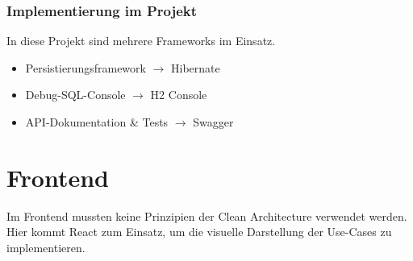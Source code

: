     	    \subsubsection{Implementierung im Projekt}
    	    In diese Projekt sind mehrere Frameworks im Einsatz. \\
    	    \begin{itemize}
    	        \item Persistierungsframework $\rightarrow$ Hibernate
    	        \item Debug-SQL-Console $\rightarrow$ H2 Console
    	        \item API-Dokumentation \& Tests $\rightarrow$ Swagger
    	    \end{itemize}

    \section{Frontend}
    Im Frontend mussten keine Prinzipien der Clean Architecture verwendet werden. Hier kommt React zum Einsatz, um die visuelle Darstellung der Use-Cases zu implementieren.